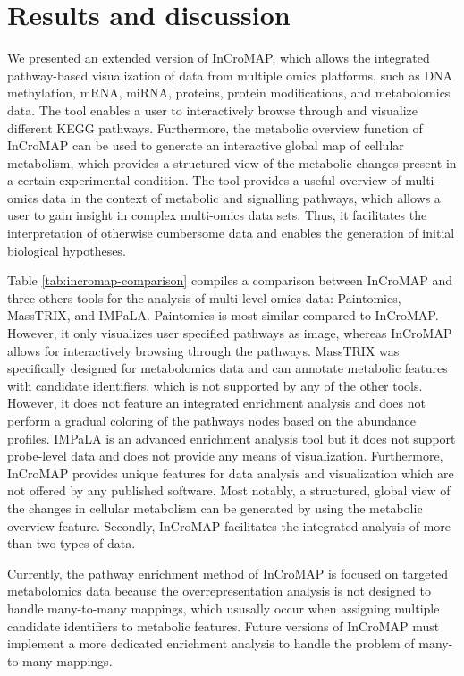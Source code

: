 \documentclass[final,5p,times,twocolumn]{elsarticle}
\newcommand\red[1]{{\color{red}#1}}
\begin{document}
\section{Results and discussion}
We presented an extended version of InCroMAP, which allows the integrated pathway-based visualization of data from multiple omics platforms, such as DNA methylation, mRNA, miRNA, proteins, protein modifications, and metabolomics data. The tool enables a user to interactively browse through and visualize different KEGG pathways. Furthermore, the metabolic overview function of InCroMAP can be used to generate an interactive global map of cellular metabolism, which provides a structured view of the metabolic changes present in a certain experimental condition. The tool provides a useful overview of multi-omics data in the context of metabolic and signalling pathways, which allows a user to gain insight in complex multi-omics data sets. Thus, it facilitates the interpretation of otherwise cumbersome data and enables the generation of initial biological hypotheses.

\red{Table \ref{tab:incromap-comparison} compiles a comparison between InCroMAP and three others tools for the analysis of multi-level omics data: Paintomics, MassTRIX, and IMPaLA. Paintomics is most similar compared to InCroMAP. However, it only visualizes user specified pathways as image, whereas InCroMAP allows for interactively browsing through the pathways. MassTRIX was specifically  designed for metabolomics data and can annotate metabolic features with candidate identifiers, which is not supported by any of the other tools. However, it does not feature an integrated enrichment analysis and does not perform a gradual coloring of the pathways nodes based on the abundance profiles. IMPaLA is an advanced enrichment analysis tool but it does not support probe-level data and does not provide any means of visualization. Furthermore, InCroMAP provides unique features for data analysis and visualization which are not offered by any published software.  Most notably, a structured, global view of the changes in 
cellular metabolism can be generated by using the metabolic overview feature. Secondly, InCroMAP facilitates the integrated analysis of more than two types of data.}

Currently, the pathway enrichment method of InCroMAP is \red{focused on targeted metabolomics data because the overrepresentation analysis is not designed to handle many-to-many mappings, which ususally occur when assigning multiple candidate identifiers to metabolic features. Future versions of InCroMAP must implement a more dedicated enrichment analysis to handle the problem of many-to-many mappings.}
\end{document}
